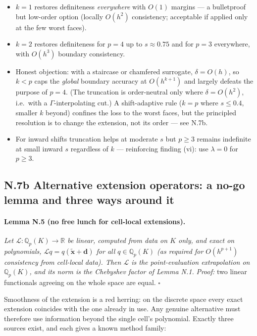 \begin{itemize}
  \item $k=1$ restores definiteness \emph{everywhere} with $O(1)$ margins
        --- a bulletproof but low-order option (locally $O(h^2)$
        consistency; acceptable if applied only at the few worst faces).
  \item $k=2$ restores definiteness for $p=4$ up to $s \approx 0.75$ and
        for $p=3$ everywhere, with $O(h^3)$ boundary consistency.
  \item Honest objection: with a staircase or chamfered surrogate,
        $\delta = O(h)$, so $k<p$ caps the \emph{global} boundary accuracy
        at $O(h^{k+1})$ and largely defeats the purpose of $p=4$. (The
        truncation is order-neutral only where $\delta = O(h^2)$, i.e.\
        with a $\Gamma$-interpolating cut.) A shift-adaptive rule
        ($k=p$ where $s \le 0.4$, smaller $k$ beyond) confines the loss to
        the worst faces, but the principled resolution is to change the
        extension, not its order --- see N.7b.
  \item For inward shifts truncation helps at moderate $s$ but $p \ge 3$
        remains indefinite at small inward $s$ regardless of $k$ ---
        reinforcing finding (vi): use $\lambda = 0$ for $p \ge 3$.
\end{itemize}

\subsection*{N.7b Alternative extension operators: a no-go lemma and three ways around it}

\paragraph{Lemma N.5 (no free lunch for cell-local extensions).}
\emph{Let $\mathcal L : \mathbb Q_p(K) \to \mathbb R$ be linear, computed
from data on $K$ only, and exact on polynomials,
$\mathcal L q = q(\tilde{\mathbf x} + \mathbf d)$ for all $q \in
\mathbb Q_p(K)$ (as required for $O(h^{p+1})$ consistency from cell-local
data). Then $\mathcal L$ \emph{is} the point-evaluation extrapolation on
$\mathbb Q_p(K)$, and its norm is the Chebyshev factor of Lemma N.1.}
\emph{Proof:} two linear functionals agreeing on the whole space are
equal. $\square$

Smoothness of the extension is a red herring: on the discrete space every
exact extension coincides with the one already in use. Any genuine
alternative must therefore use information beyond the single cell's
polynomial. Exactly three sources exist, and each gives a known method
family:

